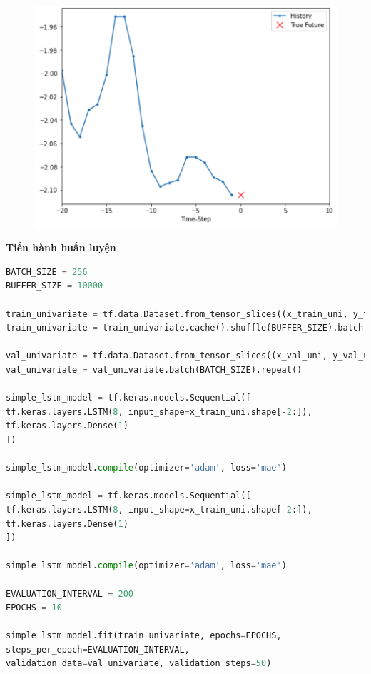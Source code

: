 \vspace{-1cm}
\begin{center}
	\begin{figure}[htp]
		\begin{center}
			\includegraphics[scale=0.3]{./images/2.png}
		\end{center}
	\end{figure}
\end{center}


\vspace{2cm}
\changefontsizes{13pt}
\setlength{\parindent}{0cm}
\textbf{Tiến hành huấn luyện}



\begin{lstlisting}[language=Python]
BATCH_SIZE = 256
BUFFER_SIZE = 10000

train_univariate = tf.data.Dataset.from_tensor_slices((x_train_uni, y_train_uni))
train_univariate = train_univariate.cache().shuffle(BUFFER_SIZE).batch(BATCH_SIZE).repeat()

val_univariate = tf.data.Dataset.from_tensor_slices((x_val_uni, y_val_uni))
val_univariate = val_univariate.batch(BATCH_SIZE).repeat()

simple_lstm_model = tf.keras.models.Sequential([
tf.keras.layers.LSTM(8, input_shape=x_train_uni.shape[-2:]),
tf.keras.layers.Dense(1)
])

simple_lstm_model.compile(optimizer='adam', loss='mae')

simple_lstm_model = tf.keras.models.Sequential([
tf.keras.layers.LSTM(8, input_shape=x_train_uni.shape[-2:]),
tf.keras.layers.Dense(1)
])

simple_lstm_model.compile(optimizer='adam', loss='mae')

EVALUATION_INTERVAL = 200
EPOCHS = 10

simple_lstm_model.fit(train_univariate, epochs=EPOCHS,
steps_per_epoch=EVALUATION_INTERVAL,
validation_data=val_univariate, validation_steps=50)
\end{lstlisting}



